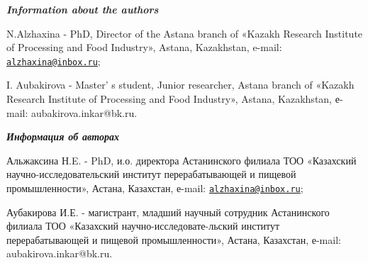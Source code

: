 \begin{authorinfo}
\hspace{1em}\emph{{\bfseries Information about the authors}}

N.Alzhaxina - PhD, Director of the Astana branch of «Kazakh Research
Institute of Processing and Food Industry», Astana, Kazakhstan, e-mail:
\href{mailto:alzhaxina@inbox.ru}{\nolinkurl{alzhaxina@inbox.ru}};

I. Aubakirova - Master' s student, Junior researcher,
Astana branch of «Kazakh Research Institute of Processing and Food
Industry», Astana, Kazakhstan, е-mail: aubakirova.inkar@bk.ru.

\hspace{1em}\emph{{\bfseries Информация об авторах}}

Альжаксина Н.E. - PhD, и.о. директора Астанинского филиала ТОО
«Казахский научно-исследовательский институт перерабатывающей и пищевой
промышленности», Астана, Казахстан, е-mail:
\href{mailto:alzhaxina@inbox.ru}{\nolinkurl{alzhaxina@inbox.ru}};

Аубакирова И.Е. - магистрант, младший научный сотрудник Астанинского
филиала ТОО «Казахский научно-исследовате-льский институт
перерабатывающей и пищевой промышленности», Астана, Казахстан, е-mail:
aubakirova.inkar@bk.ru.
\end{authorinfo}
